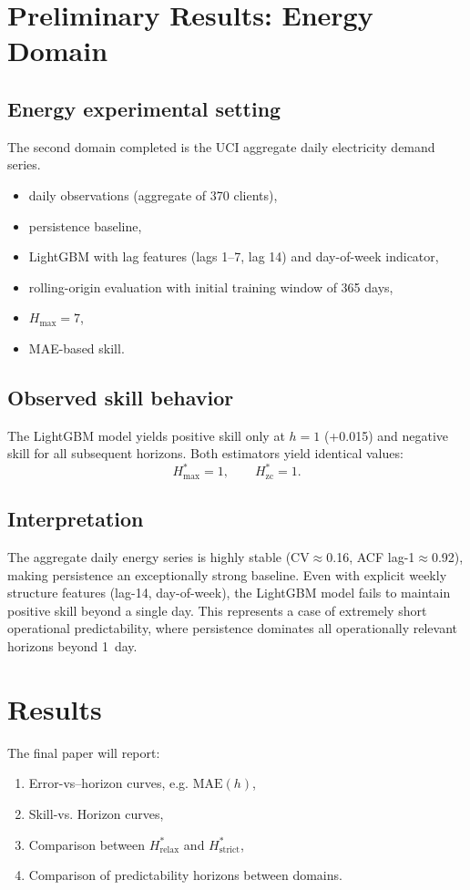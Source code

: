 \documentclass[11pt]{article}
\begin{document}
\section{Preliminary Results: Energy Domain}

\subsection{Energy experimental setting}
The second domain completed is the UCI aggregate daily electricity demand series.
\begin{itemize}
  \item daily observations (aggregate of 370 clients),
  \item persistence baseline,
  \item LightGBM with lag features (lags 1--7, lag 14) and day-of-week indicator,
  \item rolling-origin evaluation with initial training window of 365 days,
  \item $H_{\max}=7$,
  \item MAE-based skill.
\end{itemize}

\subsection{Observed skill behavior}
The LightGBM model yields positive skill only at $h=1$ (+0.015) and negative skill for all subsequent horizons.
Both estimators yield identical values:
\begin{equation}
H^*_{\max} = 1, \qquad H^*_{\mathrm{zc}} = 1.
\end{equation}

\subsection{Interpretation}
The aggregate daily energy series is highly stable (CV$\approx$0.16, ACF lag-1$\approx$0.92), making persistence an exceptionally strong baseline.
Even with explicit weekly structure features (lag-14, day-of-week), the LightGBM model fails to maintain positive skill beyond a single day.
This represents a case of extremely short operational predictability, where persistence dominates all operationally relevant horizons beyond 1~day.

\section{Results}
The final paper will report:
\begin{enumerate}
  \item Error-vs--horizon curves, e.g. $\mathrm{MAE}(h)$,
  \item Skill-vs. Horizon curves,
  \item Comparison between $H^*_{\mathrm{relax}}$ and $H^*_{\mathrm{strict}}$,
  \item Comparison of predictability horizons between domains.
\end{enumerate}
\end{document}
